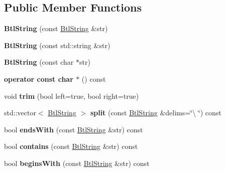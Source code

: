 \subsection*{Public Member Functions}
\begin{DoxyCompactItemize}
\item 
\mbox{\label{class_btl_string_a21d40446a7d25f3ef740f80689f32f66}} 
{\bfseries Btl\+String} (const \hyperlink{class_btl_string}{Btl\+String} \&str)
\item 
\mbox{\label{class_btl_string_aab0e0973f37c21210515b58d1f973dbd}} 
{\bfseries Btl\+String} (const std\+::string \&str)
\item 
\mbox{\label{class_btl_string_aac66632b3613e854eb4437af8e893b41}} 
{\bfseries Btl\+String} (const char $\ast$str)
\item 
\mbox{\label{class_btl_string_ad53f1bbcd9a0af65b267869395e0ac82}} 
{\bfseries operator const char $\ast$} () const
\item 
\mbox{\label{class_btl_string_a6f98887f0f3fae14f3294eb393cf8bbe}} 
void {\bfseries trim} (bool left=true, bool right=true)
\item 
\mbox{\label{class_btl_string_a2d6f3640cbd692594b1320751b8d8f99}} 
std\+::vector$<$ \hyperlink{class_btl_string}{Btl\+String} $>$ {\bfseries split} (const \hyperlink{class_btl_string}{Btl\+String} \&delims=\char`\"{}\textbackslash{} \char`\"{}) const
\item 
\mbox{\label{class_btl_string_a5804fac083c250b889873dfc6e26413d}} 
bool {\bfseries ends\+With} (const \hyperlink{class_btl_string}{Btl\+String} \&str) const
\item 
\mbox{\label{class_btl_string_aa8f891f0f2ee7464261da613499cf6fe}} 
bool {\bfseries contains} (const \hyperlink{class_btl_string}{Btl\+String} \&str) const
\item 
\mbox{\label{class_btl_string_a203047e1fec3af232da616e79bb96a6a}} 
bool {\bfseries begins\+With} (const \hyperlink{class_btl_string}{Btl\+String} \&str) const

\end{DoxyCompactItemize}
